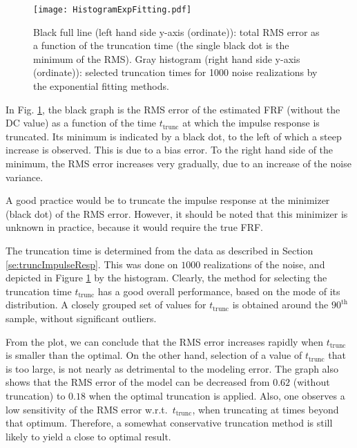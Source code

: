 \begin{figure}[htb] %
   \centering
	\texttt{[image: HistogramExpFitting.pdf]}
 \caption{Black full line (left hand side y-axis (ordinate)): total RMS error as a function of the truncation time (the single black dot is the minimum of the RMS). Gray histogram (right hand side y-axis (ordinate)): selected truncation times for 1000 noise realizations by the exponential fitting methods.}

   \label{fig:pdfAndRMSeVStruncTime}
\end{figure}

In Fig. \ref{fig:pdfAndRMSeVStruncTime}, the black graph is the RMS error of the estimated FRF (without the DC value) as a function of the time $t_\mathrm{trunc}$ at which the impulse response is truncated. Its minimum is indicated by a black dot, to the left of which a steep increase is observed. This is due to a bias error. To the right hand side of the minimum, the RMS error increases very gradually, due to an increase of the noise variance.

A good practice would be to truncate the impulse response at the minimizer (black dot) of the RMS error. However, it should be noted that this minimizer is unknown in practice, because it would require
the true FRF.

The truncation time is determined from the data as described in Section \ref{se:truncImpulseResp}. This was done on $1000$ realizations of the noise, and depicted in Figure \ref{fig:pdfAndRMSeVStruncTime} by the histogram.
Clearly, the method for selecting the truncation time $t_{\mathrm{trunc}}$ has a good overall performance, based on the mode of its distribution. A closely grouped set of values for $t_{\mathrm{trunc}}$ is obtained around the $90^{\text{th}}$ sample, without significant outliers.

From the plot, we can conclude that the RMS error increases rapidly when $t_{\mathrm{trunc}}$ is smaller than the optimal.
On the other hand, selection of a value of $t_{\mathrm{trunc}}$ that is too large, is not nearly as detrimental to the modeling error.
The graph also shows that the RMS error of the model can be decreased from $0.62$ (without truncation) to $0.18$ when the optimal truncation is applied. Also, one observes a low sensitivity of the RMS error w.r.t.~$t_\mathrm{trunc}$, when truncating at times beyond that optimum. Therefore, a somewhat conservative truncation method is still likely to yield a close to optimal result.

